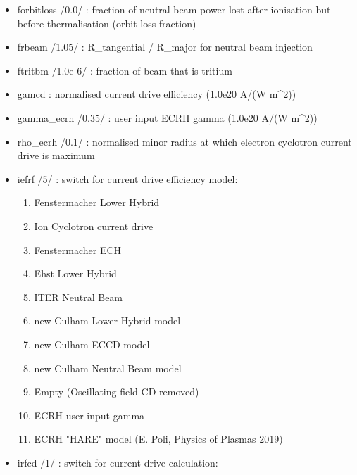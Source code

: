 \documentclass[
]{article}
\providecommand{\tightlist}{%
  \setlength{\itemsep}{0pt}\setlength{\parskip}{0pt}}
\begin{document}
\begin{itemize}
\item
  forbitloss /0.0/ : fraction of neutral beam power lost after
  ionisation but before thermalisation (orbit loss fraction)
\item
  frbeam /1.05/ : R\_tangential / R\_major for neutral beam injection
\item
  ftritbm /1.0e-6/ : fraction of beam that is tritium
\item
  gamcd : normalised current drive efficiency (1.0e20 A/(W m\^{}2))
\item
  gamma\_ecrh /0.35/ : user input ECRH gamma (1.0e20 A/(W m\^{}2))
\item
  rho\_ecrh /0.1/ : normalised minor radius at which electron cyclotron
  current drive is maximum
\item
  iefrf /5/ : switch for current drive efficiency model:

  \begin{enumerate}
  \tightlist
  \item
    Fenstermacher Lower Hybrid
  \item
    Ion Cyclotron current drive
  \item
    Fenstermacher ECH
  \item
    Ehst Lower Hybrid
  \item
    ITER Neutral Beam
  \item
    new Culham Lower Hybrid model
  \item
    new Culham ECCD model
  \item
    new Culham Neutral Beam model
  \item
    Empty (Oscillating field CD removed)
  \item
    ECRH user input gamma
  \item
    ECRH "HARE" model (E. Poli, Physics of Plasmas 2019)
  \end{enumerate}
\item
  irfcd /1/ : switch for current drive calculation:


\end{itemize}
\end{document}
